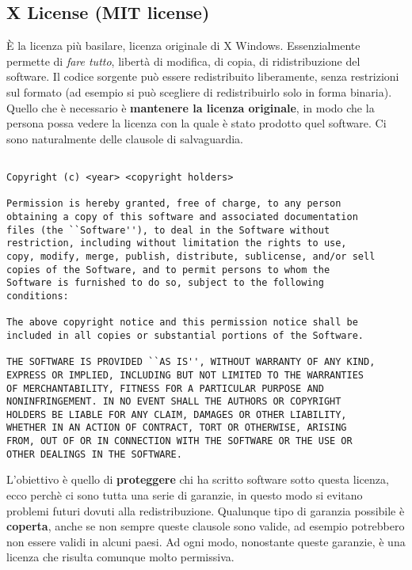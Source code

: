 \subsection{X License (MIT license)}

È la licenza più basilare, licenza originale di X Windows. Essenzialmente permette di \textit{fare tutto}, libertà di modifica, di copia, di ridistribuzione del software. Il codice sorgente può essere redistribuito liberamente, senza restrizioni sul formato (ad esempio si può scegliere di redistribuirlo solo in forma binaria). Quello che è necessario è \textbf{mantenere la licenza originale}, in modo che la persona possa vedere la licenza con la quale è stato prodotto quel software. Ci sono naturalmente delle clausole di salvaguardia. 	

\begin{lstlisting}[caption=Licenza MIT]

Copyright (c) <year> <copyright holders>

Permission is hereby granted, free of charge, to any person
obtaining a copy of this software and associated documentation
files (the ``Software''), to deal in the Software without
restriction, including without limitation the rights to use,
copy, modify, merge, publish, distribute, sublicense, and/or sell
copies of the Software, and to permit persons to whom the
Software is furnished to do so, subject to the following
conditions:

The above copyright notice and this permission notice shall be
included in all copies or substantial portions of the Software.

THE SOFTWARE IS PROVIDED ``AS IS'', WITHOUT WARRANTY OF ANY KIND,
EXPRESS OR IMPLIED, INCLUDING BUT NOT LIMITED TO THE WARRANTIES
OF MERCHANTABILITY, FITNESS FOR A PARTICULAR PURPOSE AND
NONINFRINGEMENT. IN NO EVENT SHALL THE AUTHORS OR COPYRIGHT
HOLDERS BE LIABLE FOR ANY CLAIM, DAMAGES OR OTHER LIABILITY,
WHETHER IN AN ACTION OF CONTRACT, TORT OR OTHERWISE, ARISING
FROM, OUT OF OR IN CONNECTION WITH THE SOFTWARE OR THE USE OR
OTHER DEALINGS IN THE SOFTWARE.

\end{lstlisting}

L'obiettivo è quello di \textbf{proteggere} chi ha scritto software sotto questa licenza, ecco perchè ci sono tutta una serie di garanzie, in questo modo si evitano problemi futuri dovuti alla redistribuzione. Qualunque tipo di garanzia possibile è \textbf{coperta}, anche se non sempre queste clausole sono valide, ad esempio potrebbero non essere validi in alcuni paesi. Ad ogni modo, nonostante queste garanzie, è una licenza che risulta comunque molto permissiva. 

